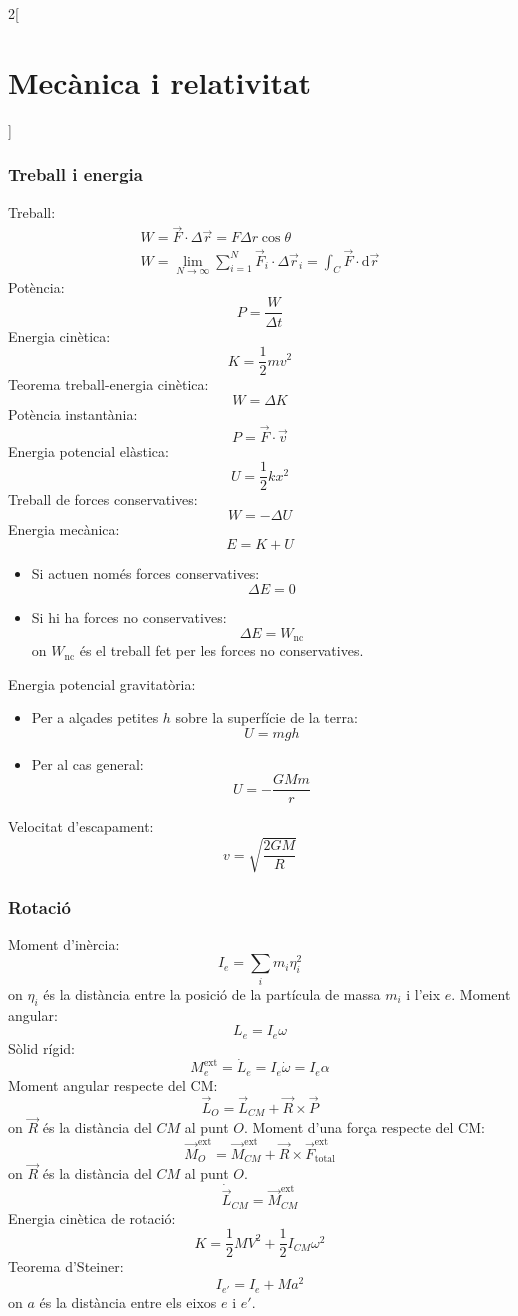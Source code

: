 \documentclass[class=article,10pt,crop=false]{standalone}
\begin{document}
\begin{multicols}{2}[\section{Mecànica i relativitat}]
\subsubsection{Treball i energia}
Treball: \begin{gather*}
    W=\Vec{F}\cdot\Delta\Vec{r}=F\Delta r\cos\theta\\
    W=\lim_{N\to\infty}\sum_{i=1}^N\Vec{F}_i\cdot\Delta\Vec{r}_i=\int_C\Vec{F}\cdot\text{d}\Vec{r}
\end{gather*}
Potència: $$P=\frac{W}{\Delta t}$$
Energia cinètica: $$K=\frac{1}{2}mv^2$$
Teorema treball-energia cinètica:
$$W=\Delta K$$
Potència instantània: $$P=\Vec{F}\cdot\Vec{v}$$
Energia potencial elàstica: $$U=\frac{1}{2}kx^2$$
Treball de forces conservatives: $$W=-\Delta U$$
Energia mecànica: $$E=K+U$$
\begin{itemize}
    \item Si actuen només forces conservatives: $$\Delta E=0$$
    \item Si hi ha forces no conservatives: $$\Delta E=W_{\text{nc}}$$ {on $W_\text{nc}$ és el treball fet per les forces no conservatives.}
\end{itemize}
Energia potencial gravitatòria: 
\begin{itemize}
    \item Per a alçades petites $h$ sobre la superfície de la terra:$$U=mgh$$
    \item Per al cas general:$$U=-\frac{GMm}{r}$$
\end{itemize}
Velocitat d'escapament: $$v=\sqrt{\frac{2GM}{R}}$$
\subsubsection{Rotació}
Moment d'inèrcia: $$I_e=\sum_im_i\eta_i^2$$ {on $\eta_i$ és la distància entre la posició de la partícula de massa $m_i$ i l'eix $e$.}\newline
Moment angular: $$L_e=I_e\omega$$
Sòlid rígid: $$M_e^\text{ext}=\dot{L}_e=I_e\dot{\omega}=I_e\alpha$$
Moment angular respecte del CM:$$\Vec{L}_O=\Vec{L}_{CM}+\Vec{R}\times\Vec{P}$$ {on $\Vec{R}$ és la distància del $CM$ al punt $O$.}\newline
Moment d'una força respecte del CM: $$\Vec{M}_O^\text{ext}=\Vec{M}_{CM}^\text{ext}+\Vec{R}\times\Vec{F}_\text{total}^\text{ext}$$ {on $\Vec{R}$ és la distància del $CM$ al punt $O$.}
$$\dot{\Vec{L}}_{CM}=\Vec{M}_{CM}^\text{ext}$$
Energia cinètica de rotació: $$K=\frac{1}{2}MV^2+\frac{1}{2}I_{CM}\omega^2$$
Teorema d'Steiner: $$I_{e'}=I_e+Ma^2$$ {on $a$ és la distància entre els eixos $e$ i $e'$.}

\end{multicols}
\end{document}

